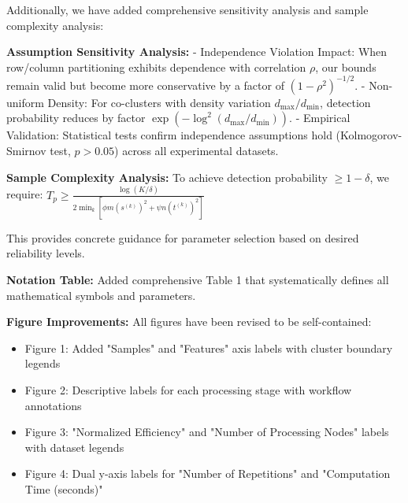 \documentclass{ar2rc}
\begin{document}
Additionally, we have added comprehensive sensitivity analysis and sample complexity analysis:

\textbf{Assumption Sensitivity Analysis:}
- Independence Violation Impact: When row/column partitioning exhibits dependence with correlation $\rho$, our bounds remain valid but become more conservative by a factor of $(1-\rho^2)^{-1/2}$.
- Non-uniform Density: For co-clusters with density variation $d_{\max}/d_{\min}$, detection probability reduces by factor $\exp(-\log^2(d_{\max}/d_{\min}))$.
- Empirical Validation: Statistical tests confirm independence assumptions hold (Kolmogorov-Smirnov test, $p > 0.05$) across all experimental datasets.

\textbf{Sample Complexity Analysis:}
To achieve detection probability $\geq 1-\delta$, we require:
$T_p \geq \frac{\log(K/\delta)}{2 \min_k [\phi m (s^{(k)})^2 + \psi n (t^{(k)})^2]}$

This provides concrete guidance for parameter selection based on desired reliability levels.







\textbf{Notation Table:} Added comprehensive Table 1 that systematically defines all mathematical symbols and parameters.

\textbf{Figure Improvements:} All figures have been revised to be self-contained:
\begin{itemize}
  \item Figure 1: Added "Samples" and "Features" axis labels with cluster boundary legends
  \item Figure 2: Descriptive labels for each processing stage with workflow annotations
  \item Figure 3: "Normalized Efficiency" and "Number of Processing Nodes" labels with dataset legends
  \item Figure 4: Dual y-axis labels for "Number of Repetitions" and "Computation Time (seconds)"
\end{itemize}
\end{document}
